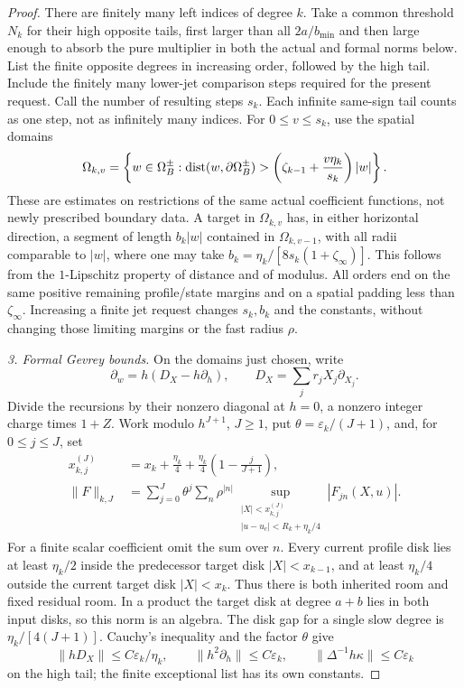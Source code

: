 \begin{proof}
There are finitely many left indices of degree $k$.  Take a common
threshold $N_k$ for their high opposite tails, first larger than all
$2a/b_{\min}$ and then large enough to absorb the pure multiplier in
both the actual and formal norms below.  List the finite opposite
degrees in increasing order, followed by the high tail.  Include the
finitely many lower-jet comparison steps required for the present
request.  Call the number of resulting steps $s_k$.  Each infinite
same-sign tail counts as one step, not as infinitely many indices.
For $0\le v\le s_k$, use the spatial domains
\begin{equation}\label{eq:additive-spatial-schedule}
 \Omega_{k,v}=\left\{w\in\Omega_B^\pm:
  \operatorname{dist}(w,\partial\Omega_B^\pm)>
   \left(\zeta_{k-1}+\frac{v\eta_k}{s_k}\right)|w|\right\}.
\end{equation}
These are estimates on restrictions of the same actual coefficient
functions, not newly prescribed boundary data.  A target in
$\Omega_{k,v}$ has, in either horizontal direction, a segment of length
$b_k|w|$ contained in $\Omega_{k,v-1}$, with all radii comparable to
$|w|$, where one may take
$b_k=\eta_k/[8s_k(1+\zeta_\infty)]$.
This follows from the $1$-Lipschitz property of distance and of modulus.
All orders end on the same positive remaining profile/state margins
and on a spatial padding less than $\zeta_\infty$.  Increasing a finite
jet request changes $s_k,b_k$ and the constants, without changing those
limiting margins or the fast radius $\rho$.

\emph{3. Formal Gevrey bounds.}
On the domains just chosen, write
\[
 \partial_w=h(D_X-h\partial_h),\qquad
 D_X=\sum_j r_jX_j\partial_{X_j}.
\]
Divide the recursions by their nonzero diagonal at $h=0$, a nonzero
integer charge times $1+Z$.  Work modulo $h^{J+1}$, $J\ge1$, put
$\theta=\varepsilon_k/(J+1)$, and, for $0\le j\le J$, set
\begin{align}
 x_{k,j}^{(J)}&=x_k+\frac{\eta_k}{4}
       +\frac{\eta_k}{4}\left(1-\frac{j}{J+1}\right),
             \label{eq:additive-formal-disks}\\
 \|F\|_{k,J}&=\sum_{j=0}^J\theta^j\sum_n\rho^{|n|}
     \sup_{\substack{|X|<x_{k,j}^{(J)}\\
                     |u-u_c|<R_k+\eta_k/4}}|F_{jn}(X,u)|.
             \label{eq:additive-formal-norm}
\end{align}
For a finite scalar coefficient omit the sum over $n$.  Every current
profile disk lies at least $\eta_k/2$ inside the predecessor target
disk $|X|<x_{k-1}$, and at least $\eta_k/4$ outside the current target
disk $|X|<x_k$.  Thus there is both inherited room and fixed residual
room.  In a product the target disk at degree $a+b$ lies in both input
disks, so this norm is an algebra.  The disk gap for a single slow
degree is $\eta_k/[4(J+1)]$.  Cauchy's inequality and the factor
$\theta$ give
\begin{equation}\label{eq:additive-truncated-operators}
 \|hD_X\|\le C\varepsilon_k/\eta_k,\qquad
 \|h^2\partial_h\|\le C\varepsilon_k,
 \qquad\|\Delta^{-1}h\kappa\|\le C\varepsilon_k
\end{equation}
on the high tail; the finite exceptional list has its own constants.


\end{proof}
